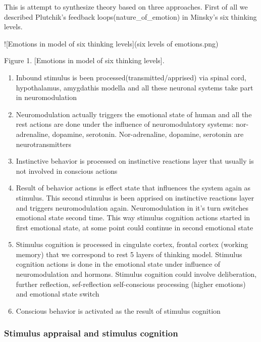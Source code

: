 This is attempt to synthesize theory based on three approaches. First of all we described Plutchik's feedback loops(nature_of_emotion) in Minsky's six thinking levels.

![Emotions in model of six thinking levels](six levels of emotions.png)

Figure 1. [Emotions in model of six thinking levels].

\begin{enumerate}
\item  Inbound stimulus is been processed(transmitted/apprised) via spinal cord, hypothalamus, amygdathis modella and all these neuronal systems take part in neuromodulation
\item  Neuromodulation actually triggers the emotional state of human and all the rest actions are done under the influence of neuromodulatory systems: nor-adrenaline, dopamine, serotonin. Nor-adrenaline, dopamine, serotonin are neurotransmitters
\item  Instinctive behavior is processed on instinctive reactions layer that usually is not involved in conscious actions
\item  Result of behavior actions is effect state that influences the system again as stimulus. This second stimulus is been apprised on instinctive reactions layer and triggers neuromodulation again. Neuromodulation in it's turn switches emotional state second time. This way stimulus cognition actions started in first emotional state, at some point could continue in second emotional state
\item  Stimulus cognition is processed in cingulate cortex, frontal cortex (working memory) that we correspond to rest 5 layers of thinking model. Stimulus cognition actions is done in the emotional state under influence of neuromodulation and hormons. Stimulus cognition could involve deliberation, further reflection, sef-reflection self-conscious processing (higher emotions) and  emotional state switch
\item  Conscious behavior is activated as the result of stimulus cognition
\end{enumerate}

\subsubsection{Stimulus appraisal and stimulus cognition}

